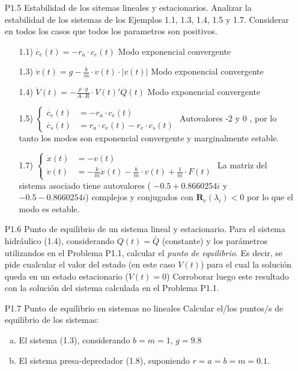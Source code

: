 \documentclass{article}
\begin{document}
\begin{itemize}
  \item[P1.5] Estabilidad de los sitemas lineales y estacionarios. Analizar la estabilidad de los sistemas de los Ejemplos 1.1, 1.3, 1.4, 1.5 y 1.7. Considerar en todos los casos que todos los parametros son positivos.

\begin{itemize}
        \item[1.1)] $ \dot{c_e}(t) = -r_a \cdot c_e(t) $ Modo exponencial convergente
        \item[1.3)] $ \dot{v}(t) = g - \frac{b}{m} \cdot v(t) \cdot \lvert v(t) \rvert $  Modo exponencial convergente
        \item[1.4)] $ \dot{V}(t) = - \frac{\rho \cdot g}{A \cdot R} \cdot V(t) 'Q(t) $  Modo exponencial convergente
        \item[1.5)] 
$
\left\{ \begin{array}{rl}
  \dot{c_e}(t) &= - r_a  \cdot c_e(t) \\
  \dot{c_s}(t) &= r_a \cdot c_e(t) - r_e \cdot c_s(t)
       \end{array} \right .
$
Autovalores -2 y 0 , por lo tanto los modos son exponencial convergente y marginalmente estable.

        \item[1.7)] 
$
\left\{ \begin{array}{rl}
  \dot{x}(t) &= - v(t) \\
  \dot{v}(t) &= - \frac{k}{m} \dot x(t) - \frac{b}{m}\cdot v(t) + \frac{1}{m} \cdot F(t)
       \end{array} \right .
$
La matriz del sistema asociado tiene autovalores ( $- 0.5 + 0.8660254i$ y $ - 0.5 - 0.8660254i $) complejos y conjugados con $\mathbf{R}_e (\lambda_{i}) < 0$ por lo que el modo es estable.
\end{itemize}

  \item[P1.6] Punto de equilibrio de un sistema lineal y estacionario. Para el sistema hidráulico (1.4), considerando $Q(t)=\bar{Q}$ (constante) y los parámetros utilizandos en el Problema P1.1, calcular el \textit{punto de equilibrio}. Es decir, se pide cualcular el valor del estado (en este caso $V(t)$) para el cual la solución queda en un estado estacionario ($\dot{V}(t)=0$)
Corroborar luego este resultado con la solución del sistema calculada en el Problema P1.1.

   \item[P1.7] Punto de equilibrio en sistemas no lineales Calcular el/los puntos/s de equilibrio de los sistemas:
        \begin{enumerate}[a)]
        \item El sistema (1.3), considerando $b=m=1$, $g=9.8$
        \item El sistema presa-depredador (1.8), suponiendo $r=a=b=m=0.1$. 
        \end{enumerate}


\end{itemize}
\end{document}
